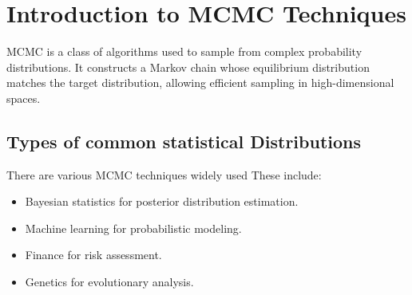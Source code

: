 \documentclass[12pt,a4paper]{article}
\begin{document}
%
%

\section{Introduction to MCMC Techniques}
MCMC is a class of algorithms used to sample from complex probability distributions. It constructs a Markov chain whose equilibrium distribution matches the target distribution, allowing efficient sampling in high-dimensional spaces.

\subsection{ Types of common statistical Distributions}
There are various MCMC techniques widely used These include:
\begin{itemize}
    \item Bayesian statistics for posterior distribution estimation.
    \item Machine learning for probabilistic modeling.
    \item Finance for risk assessment.
    \item Genetics for evolutionary analysis.
\end{itemize}
\end{document}
